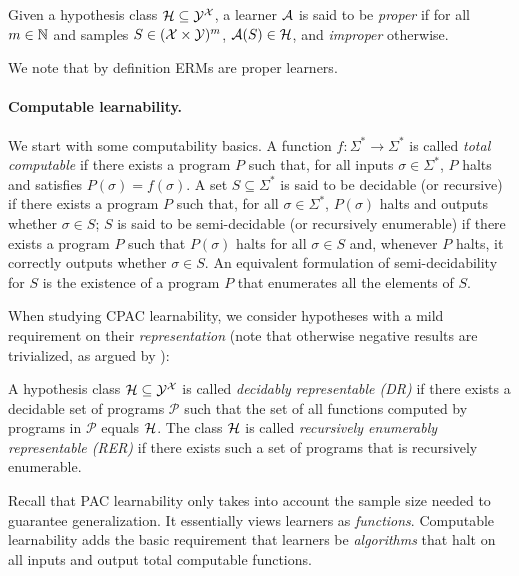 \documentclass[11pt]{article}
\begin{document}
\begin{definition}
    Given a hypothesis class $\mathcal{H}\subseteq\mathcal{Y}^{\mathcal{X}}$, a learner $\mathcal{A}$ is said to be \emph{proper} if for all $m\in\mathbb{N}$ and samples $S\in(\mathcal{X}\times\mathcal{Y})^{m}$, $\mathcal{A}(S)\in \mathcal{H}$, and \emph{improper} otherwise.
\end{definition}

We note that by definition ERMs are proper learners.

\paragraph{Computable learnability.}
We start with some computability basics.
A function $f:\Sigma^*\rightarrow\Sigma^*$ is called \emph{total computable} if there exists a program $P$ such that, for all inputs $\sigma\in\Sigma^*$, $P$ halts  and satisfies $P(\sigma)=f(\sigma)$. 
A set $S\subseteq\Sigma^*$ is said to be decidable (or recursive) if there exists a program $P$ such that, for all $\sigma\in\Sigma^*$, $P(\sigma)$ halts and outputs whether $\sigma\in S$; $S$ is said to be semi-decidable (or recursively enumerable) if there exists a program $P$ such that $P(\sigma)$ halts for all $\sigma\in S$ and, whenever $P$ halts, it correctly outputs whether $\sigma\in S$.
An equivalent formulation of semi-decidability for $S$ is the existence of a program $P$ that enumerates all the elements of $S$.

When studying CPAC learnability, we consider hypotheses with a mild requirement on their \emph{representation} (note that otherwise negative results are trivialized, as argued by \cite{agarwal2020learnability}):

\begin{definition}
    A hypothesis class $\mathcal{H}\subseteq\mathcal{Y}^{\mathcal{X}}$ is called \emph{decidably representable (DR)} if there exists a decidable set of programs $\mathcal P$ such that the set of all functions computed by programs in $\mathcal P$ equals $\mathcal{H}$. 
    The class $\mathcal{H}$ is called \emph{recursively enumerably representable (RER)} if there exists such a set of programs that is recursively enumerable.
\end{definition}

Recall that PAC learnability only takes into account the sample size needed to guarantee generalization. 
It essentially views learners as \emph{functions}.
Computable learnability adds the basic requirement that learners be \emph{algorithms} that halt on all inputs and output total computable functions.
\end{document}
